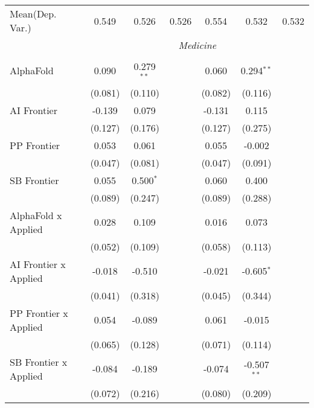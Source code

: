 \begin{tabular}{lcccccc}
Mean(Dep. Var.) & 0.549 & 0.526 & 0.526 & 0.554 & 0.532 & 0.532 \\
 & \multicolumn{6}{c}{\textit{Medicine}} \\ \\
   AlphaFold                      & 0.090   & 0.279$^{**}$ &                & 0.060   & 0.294$^{**}$  &   \\   
                                  & (0.081) & (0.110)      &                & (0.082) & (0.116)       &   \\   
   AI Frontier                    & -0.139  & 0.079        &                & -0.131  & 0.115         &   \\   
                                  & (0.127) & (0.176)      &                & (0.127) & (0.275)       &   \\   
   PP Frontier                    & 0.053   & 0.061        &                & 0.055   & -0.002        &   \\   
                                  & (0.047) & (0.081)      &                & (0.047) & (0.091)       &   \\   
   SB Frontier                    & 0.055   & 0.500$^{*}$  &                & 0.060   & 0.400         &   \\   
                                  & (0.089) & (0.247)      &                & (0.089) & (0.288)       &   \\   
   AlphaFold x Applied            & 0.028   & 0.109        &                & 0.016   & 0.073         &   \\   
                                  & (0.052) & (0.109)      &                & (0.058) & (0.113)       &   \\   
   AI Frontier x Applied          & -0.018  & -0.510       &                & -0.021  & -0.605$^{*}$  &   \\   
                                  & (0.041) & (0.318)      &                & (0.045) & (0.344)       &   \\   
   PP Frontier x Applied          & 0.054   & -0.089       &                & 0.061   & -0.015        &   \\   
                                  & (0.065) & (0.128)      &                & (0.071) & (0.114)       &   \\   
   SB Frontier x Applied          & -0.084  & -0.189       &                & -0.074  & -0.507$^{**}$ &   \\   
                                  & (0.072) & (0.216)      &                & (0.080) & (0.209)       &   \\   

\end{tabular}
